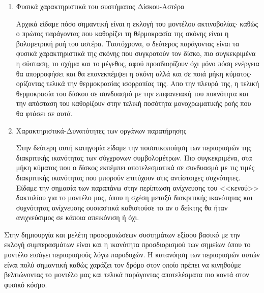 \begin{enumerate}

\item Φυσικά χαρακτηριστικά του συστήματος Δίσκου-Αστέρα

Αρχικά είδαμε πόσο σημαντική είναι η εκλογή του μοντέλου ακτινοβολίας$\cdot$ καθώς ο πρώτος παράγοντας που καθορίζει τη θέρμοκρασία της σκόνης είναι η βολομετρική ροή του αστέρα. Ταυτόχρονα, ο δεύτερος παράγοντας είναι τα φυσικά χαρακτηριστικά της σκόνης που συγκροτούν τον δίσκο, πιο συγκεκριμένα η σύσταση, το σχήμα και το μέγεθος, αφού προσδιορίζουν όχι μόνο πόση ενέργεια θα απορροφήσει και θα επανεκπέμψει η σκόνη αλλά και σε ποιά μήκη κύματος$\cdot$ ορίζοντας τελικά την θερμοκρασίας ισορροπίας της. Απο την πλευρά της, η τελική θερμοκρασία του δίσκου σε συνδυασμό με την επιφανειακή του πυκνότητα και την απόσταση του καθορίζουν στην τελική ποσότητα μονοχρωματικής ροής που θα φτάσει σε αυτά.

\item Χαρακτηριστικά-Δυνατότητες των οργάνων παρατήρησης

Στην δεύτερη αυτή κατηγορία είδαμε την ποσοτικοποίηση των περιορισμών της διακριτικής ικανότητας των σύγχρονων συμβολομέτρων. Πιο συγκεκριμένα, στα μήκη κύματος που ο δίσκος εκπέμπει αποτελεσματικά σε συνδυασμό με τις τιμές διακριτικής ικανότητας που μπορούν επιτύχουν στις αντίστοιχες συχνότητες. Είδαμε την σημασία των παραπάνω στην περίπτωση ανίχνευσης του <<κενού>> δακτυλίου για το μοντέλο μας, όπου η σχέση μεταξύ διακριτικής ικανότητας και συχνότητας ανίχνευσης ουσιαστικά καθιστούσε το αν ο δείκτης θα ήταν ανιχνεύσιμος σε κάποια απεικόνιση ή όχι.
\end{enumerate}

Στην δημιουργία και μελέτη προσομοιώσεων συστημάτων εξίσου βασικό με την εκλογή συμπερασμάτων είναι και η ικανότητα προσδιορισμού των σημείων όπου το μοντέλο εισάγει περιορισμούς λόγω παροδοχών. Η κατανόηση των περιορισμών αυτών είναι πολύ σημαντική καθώς χαράζει τον δρόμο στον οποίο πρέπει να κινηθούμε βελτιώνοντας το μοντέλο μας και τελικά παράγοντας αποτελέσματα πιο κοντά στον φυσικό κόσμο.\\ 

